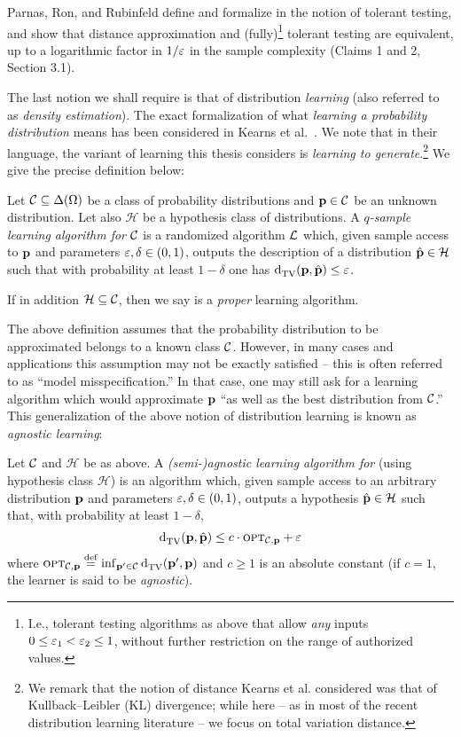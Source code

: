 \begin{remark}
Parnas, Ron, and Rubinfeld define and formalize in \cite{PRR:06} the notion of tolerant testing, and show that distance approximation and (fully)\footnote{I.e., tolerant testing algorithms as above that allow \emph{any} inputs $0 \leq \varepsilon_1 < \varepsilon_2 \leq 1$, without further restriction on the range of authorized values.} tolerant testing are equivalent, up to a logarithmic factor in $1/\varepsilon$ in the sample complexity (Claims 1 and 2, Section 3.1).
\end{remark}

The last notion we shall require is that of distribution \emph{learning} (also referred to as \emph{density estimation}). The exact formalization of what \emph{learning a probability distribution} means has been considered in Kearns et al.~\cite{Kearns:94}. We note that in their language, the variant of learning this thesis considers is \emph{learning to generate}.\footnote{We remark that the notion of distance Kearns et al. considered was that of Kullback--Leibler (KL) divergence; while here -- as in most of the recent distribution learning literature -- we focus on total variation distance.}{} We give the precise definition below:  
\begin{definition}
Let $\mathcal{C}\subseteq\Delta\!\left({\Omega}\right)$ be a class of probability distributions and $\mathbf{p}\in \mathcal{C}$ be an unknown distribution. Let also $\mathcal{H}$ be a hypothesis class of distributions. 
A \emph{$q$-sample learning algorithm for $\mathcal{C}$} is a randomized algorithm $\mathcal{L}$ which, given sample access to $\mathbf{p}$ and parameters $\varepsilon,\delta\in(0,1)$,  outputs the description of a distribution $\hat{\mathbf{p}}\in \mathcal{H}$ such that with probability at least $1-\delta$ one has ${\operatorname{d}_{\rm{TV}}^{}\!\left({\mathbf{p}, \hat{\mathbf{p}}}\right)}\leq \varepsilon$. 

\noindent If in addition $\mathcal{H}\subseteq \mathcal{C}$, then we say \Learner is a \emph{proper} learning algorithm.   
\end{definition}
The above definition assumes that the probability distribution to be approximated belongs to a known class $\mathcal{C}$. However, in many cases and applications this assumption may not be exactly satisfied -- this is often referred to as ``model misspecification.'' In that case, one may still ask for a learning algorithm which would approximate $\mathbf{p}$ ``as well as the best distribution from $\mathcal{C}$.'' This generalization of the above notion of distribution learning is known as \emph{agnostic learning}:
\begin{definition}
Let $\mathcal{C}$  and $\mathcal{H}$ be as above. A \emph{(semi-)agnostic learning algorithm for \class} (using hypothesis class $\mathcal{H}$) is an algorithm \Algo which, given sample access to an arbitrary distribution $\mathbf{p}$ and parameters $\varepsilon,\delta\in(0,1)$, outputs a hypothesis $\hat{\mathbf{p}}\in\mathcal{H}$ such that,  with probability at least $1-\delta$,
\[
	{\operatorname{d}_{\rm{TV}}^{}\!\left({\mathbf{p}, \hat{\mathbf{p}}}\right)} \leq c\cdot{\textsc{opt}}_{\mathcal{C},\mathbf{p}} + \varepsilon
\]
where ${\textsc{opt}}_{\mathcal{C},\mathbf{p}}\stackrel{\rm def}{=} \inf_{\mathbf{p}'\in\mathcal{C}} {\operatorname{d}_{\rm{TV}}^{}\!\left({\mathbf{p}', \mathbf{p}}\right)}$ and $c\geq 1$ is an absolute constant (if $c=1$, the learner is said to be \emph{agnostic}).
\end{definition}

